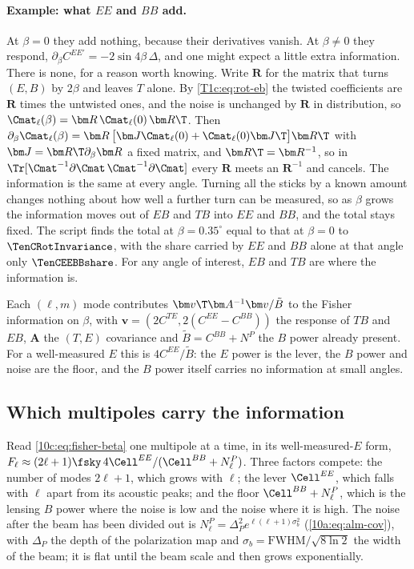 \paragraph{Example: what $EE$ and $BB$ add.} At $\beta=0$ they add nothing, because their derivatives vanish. At
$\beta\neq0$ they respond, $\partial_\beta C^{EE\prime}=-2\sin4\beta\,\Delta$, and one might expect a little extra
information. There is none, for a reason worth knowing. Write $\bm R$ for the matrix that turns $(E,B)$ by $2\beta$
and leaves $T$ alone. By \cref{T1c:eq:rot-eb} the twisted coefficients are $\bm R$ times the untwisted ones, and the
noise is unchanged by $\bm R$ in distribution, so $\Cmat_\ell(\beta)=\bm R\,\Cmat_\ell(0)\,\bm R\T$. Then
$\partial_\beta\Cmat_\ell(\beta)=\bm R\,\bigl[\bm J\Cmat_\ell(0)+\Cmat_\ell(0)\bm J\T\bigr]\bm R\T$ with
$\bm J=\bm R\T\partial_\beta\bm R$ a fixed matrix, and $\bm R\T=\bm R^{-1}$, so in
$\Tr[\Cmat^{-1}\partial\Cmat\,\Cmat^{-1}\partial\Cmat]$ every $\bm R$ meets an $\bm R^{-1}$ and cancels. The information is the
same at every angle. Turning all the sticks by a known amount changes nothing about how well a further turn can
be measured, so as $\beta$ grows the information moves out of $EB$ and $TB$ into $EE$ and $BB$, and the total stays
fixed. The script finds the total at $\beta=0.35^\circ$ equal to that at $\beta=0$ to $\TenCRotInvariance$, with the
share carried by $EE$ and $BB$ alone at that angle only $\TenCEEBBshare$. For any angle of interest, $EB$ and $TB$
are where the information is.

\begin{keyidea}
Each $(\ell,m)$ mode contributes $\bm v\T\bm A^{-1}\bm v/\tilde B$ to the Fisher information on $\beta$, with
$\bm v=(2C^{TE},2(C^{EE}-C^{BB}))$ the response of $TB$ and $EB$, $\bm A$ the $(T,E)$ covariance and $\tilde B=C^{BB}+N^P$
the $B$ power already present. For a well-measured $E$ this is $4C^{EE}/\tilde B$: the $E$ power is the lever, the
$B$ power and noise are the floor, and the $B$ power itself carries no information at small angles.
\end{keyidea}

\subsection{Which multipoles carry the information}
\label{10c:sec:info-ell}

Read \eqref{10c:eq:fisher-beta} one multipole at a time, in its well-measured-$E$ form,
$F_\ell\approx(2\ell+1)\fsky\,4\Cell^{EE}/(\Cell^{BB}+N^P_\ell)$. Three factors compete: the number of modes $2\ell+1$, which
grows with $\ell$; the lever $\Cell^{EE}$, which falls with $\ell$ apart from its acoustic peaks; and the floor
$\Cell^{BB}+N^P_\ell$, which is the lensing $B$ power where the noise is low and the noise where it is high. The noise
after the beam has been divided out is $N^P_\ell=\Delta_P^2e^{\ell(\ell+1)\sigma_b^2}$ (\cref{10a:eq:alm-cov}), with
$\Delta_P$ the depth of the polarization map and $\sigma_b=\mathrm{FWHM}/\sqrt{8\ln2}$ the width of the beam; it is
flat until the beam scale and then grows exponentially.

